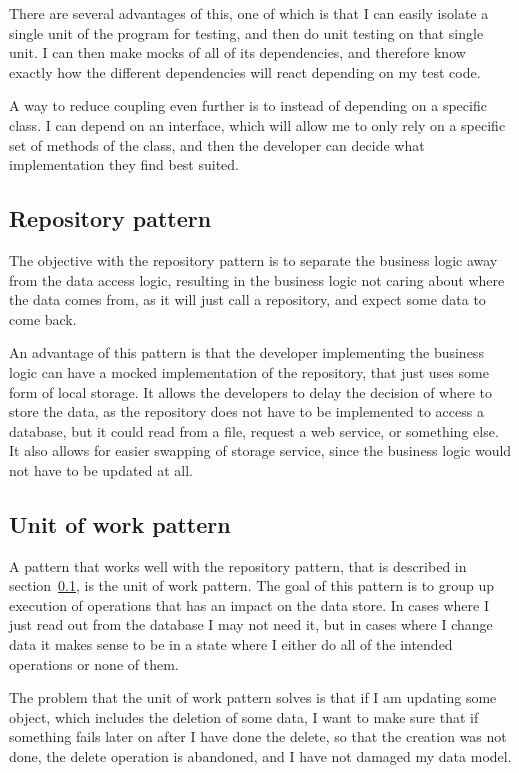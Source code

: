 There are several advantages of this, one of which is that I can easily isolate
a single unit of the program for testing, and then do unit testing on that
single unit. I can then make mocks of all of its dependencies, and therefore
know exactly how the different dependencies will react depending on my test
code\cite{dependency_injection}. 

A way to reduce coupling even further is to instead of depending on a specific
class. I can depend on an interface, which will allow me to only rely on a
specific set of methods of the class, and then the developer can decide what
implementation they find best suited. 

\subsection{Repository pattern}
\label{sub:repository_pattern}
The objective with the repository pattern is to separate the business logic away
from the data access logic, resulting in the business logic not caring about
where the data comes from, as it will just call a repository, and expect some
data to come back. 

An advantage of this pattern is that the developer implementing the business
logic can have a mocked implementation of the repository, that just uses some
form of local storage. It allows the developers to delay the decision of where
to store the data, as the repository does not have to be implemented to access a
database, but it could read from a file, request a web service, or something
else\cite{repository_pattern}. It also allows for easier swapping of storage
service, since the business logic would not have to be updated at all. 

\subsection{Unit of work pattern}
\label{sub:unit_of_work_pattern}
A pattern that works well with the repository pattern, that is described in
section~\ref{sub:repository_pattern}, is the unit of work pattern. The goal of
this pattern is to group up execution of operations that has an impact on the
data store. In cases where I just read out from the database I may not need it,
but in cases where I change data it makes sense to be in a state where I either
do all of the intended operations or none of them. 

The problem that the unit of work pattern solves is that if I am updating some
object, which includes the deletion of some data, I want to make sure that if
something fails later on after I have done the delete, so that the creation was
not done, the delete operation is abandoned, and I have not damaged my data
model\cite{uow}. 

